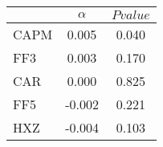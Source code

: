 \begin{tabular}{lcc}
\toprule
 & $\alpha$ & $Pvalue$ \\
\midrule
CAPM & 0.005 & 0.040 \\
FF3 & 0.003 & 0.170 \\
CAR & 0.000 & 0.825 \\
FF5 & -0.002 & 0.221 \\
HXZ & -0.004 & 0.103 \\
\bottomrule
\end{tabular}
